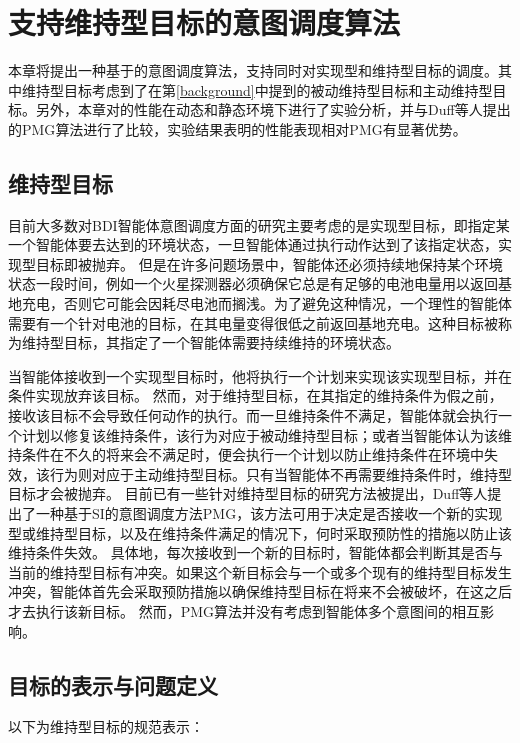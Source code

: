 \chapter{支持维持型目标的意图调度算法}\label{mg}
本章将提出一种基于\SA 的意图调度算法\SAM ，\SAM 支持同时对实现型和维持型目标的调度。其中维持型目标考虑到了在第\ref{background}中提到的被动维持型目标和主动维持型目标。另外，本章对\SAM 的性能在动态和静态环境下进行了实验分析，并与Duff等人提出的PMG\cite{DBLP:conf/atal/DuffHT06}算法进行了比较，实验结果表明\SAM 的性能表现相对PMG有显著优势。
\section{维持型目标}
目前大多数对BDI智能体意图调度方面的研究主要考虑的是实现型目标，即指定某一个智能体要去达到的环境状态，一旦智能体通过执行动作达到了该指定状态，实现型目标即被抛弃。
但是在许多问题场景中，智能体还必须持续地保持某个环境状态一段时间，例如一个火星探测器必须确保它总是有足够的电池电量用以返回基地充电，否则它可能会因耗尽电池而搁浅。为了避免这种情况，一个理性的智能体需要有一个针对电池的目标，在其电量变得很低之前返回基地充电。这种目标被称为维持型目标，其指定了一个智能体需要持续维持的环境状态。


当智能体接收到一个实现型目标时，他将执行一个计划来实现该实现型目标，并在条件实现放弃该目标。
%
然而，对于维持型目标，在其指定的维持条件为假之前，接收该目标不会导致任何动作的执行。而一旦维持条件不满足，智能体就会执行一个计划以修复该维持条件，该行为对应于被动维持型目标；或者当智能体认为该维持条件在不久的将来会不满足时，便会执行一个计划以防止维持条件在环境中失效，该行为则对应于主动维持型目标。只有当智能体不再需要维持条件时，维持型目标才会被抛弃。
目前已有一些针对维持型目标的研究方法被提出，Duff等人\cite{DBLP:conf/atal/DuffHT06}提出了一种基于SI的意图调度方法PMG，该方法可用于决定是否接收一个新的实现型或维持型目标，以及在维持条件满足的情况下，何时采取预防性的措施以防止该维持条件失效。
具体地，每次接收到一个新的目标时，智能体都会判断其是否与当前的维持型目标有冲突。如果这个新目标会与一个或多个现有的维持型目标发生冲突，智能体首先会采取预防措施以确保维持型目标在将来不会被破坏，在这之后才去执行该新目标。
然而，PMG算法并没有考虑到智能体多个意图间的相互影响。

\section{目标的表示与问题定义}
以下为维持型目标的规范表示：
